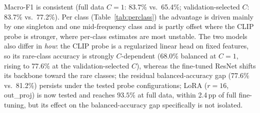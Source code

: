 \documentclass[10pt,a4paper]{article}
\begin{document}
Macro-F1 is consistent (full data $C{=}1$: 83.7\% vs.\ 65.4\%; validation-selected $C$: 83.7\% vs.\ 77.2\%). Per class (Table~\ref{tab:perclass}) the advantage is driven mainly by one singleton and one mid-frequency class and is partly offset where the CLIP probe is stronger, where per-class estimates are most unstable. The two models also differ in \emph{how}: the CLIP probe is a regularized linear head on fixed features, so its rare-class accuracy is strongly $C$-dependent (68.0\% balanced at $C{=}1$, rising to 77.6\% at the validation-selected $C$), whereas the fine-tuned ResNet shifts its backbone toward the rare classes; the residual balanced-accuracy gap (77.6\% vs.\ 81.2\%) persists under the tested probe configurations; LoRA ($r{=}16$, out\_proj) is now tested and reaches $93.5\%$ at full data, within 2.4\,pp of full fine-tuning, but its effect on the balanced-accuracy gap specifically is not isolated.
\end{document}
